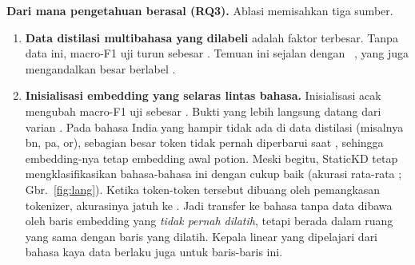 \textbf{Dari mana pengetahuan  berasal (RQ3).} Ablasi memisahkan tiga sumber.
\begin{enumerate}
  \item \textbf{Data distilasi multibahasa yang dilabeli } adalah faktor terbesar. Tanpa data ini, macro-F1 uji turun sebesar . Temuan ini sejalan dengan ~\cite{ye2022sparse}, yang juga mengandalkan  besar berlabel .
  \item \textbf{Inisialisasi embedding yang selaras lintas bahasa.} Inisialisasi acak mengubah macro-F1 uji sebesar . Bukti yang lebih langsung datang dari varian . Pada bahasa India yang hampir tidak ada di data distilasi (misalnya bn, pa, or), sebagian besar token tidak pernah diperbarui saat , sehingga embedding-nya tetap embedding awal potion. Meski begitu, StaticKD tetap mengklasifikasikan bahasa-bahasa ini dengan cukup baik (akurasi rata-rata ; Gbr.~\ref{fig:lang}). Ketika token-token tersebut dibuang oleh pemangkasan tokenizer, akurasinya jatuh ke . Jadi transfer ke bahasa tanpa data dibawa oleh baris embedding yang \emph{tidak pernah dilatih}, tetapi berada dalam ruang yang sama dengan baris yang dilatih. Kepala linear yang dipelajari dari bahasa kaya data berlaku juga untuk baris-baris ini.


\end{enumerate}
